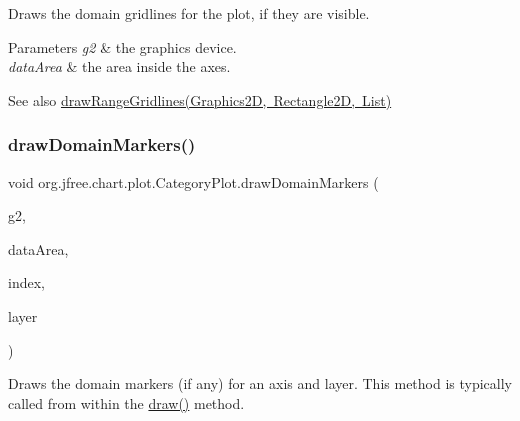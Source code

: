 Draws the domain gridlines for the plot, if they are visible.


\begin{DoxyParams}{Parameters}
{\em g2} & the graphics device. \\
\hline
{\em data\+Area} & the area inside the axes.\\
\hline
\end{DoxyParams}
\begin{DoxySeeAlso}{See also}
\mbox{\hyperlink{classorg_1_1jfree_1_1chart_1_1plot_1_1_category_plot_a7a200988686205d3aa4781365c589396}{draw\+Range\+Gridlines(\+Graphics2\+D, Rectangle2\+D, List)}} 
\end{DoxySeeAlso}
\mbox{\label{classorg_1_1jfree_1_1chart_1_1plot_1_1_category_plot_af585bf6fad134c483b15f2503a5ddcf0}} 
\subsubsection{\texorpdfstring{draw\+Domain\+Markers()}{drawDomainMarkers()}}
{\footnotesize\ttfamily void org.\+jfree.\+chart.\+plot.\+Category\+Plot.\+draw\+Domain\+Markers (\begin{DoxyParamCaption}\item[{Graphics2D}]{g2,  }\item[{Rectangle2D}]{data\+Area,  }\item[{int}]{index,  }\item[{Layer}]{layer }\end{DoxyParamCaption})\hspace{0.3cm}{\ttfamily [protected]}}

Draws the domain markers (if any) for an axis and layer. This method is typically called from within the \mbox{\hyperlink{classorg_1_1jfree_1_1chart_1_1plot_1_1_category_plot_ac32fc9b28844db99ced138bd570596c3}{draw()}} method.


